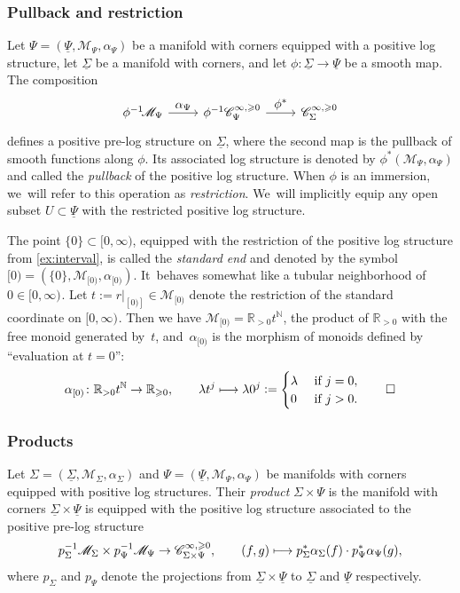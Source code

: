 \documentclass[JEP,XML,SOM,Unicode,NoFloatCountersInSection,published]{cedram}
\let\tst\textstyle
\newcommand\mto{\mathchoice{\longmapsto}{\mapsto}{\mapsto}{\mapsto}}
\theoremstyle{definition}
\theoremstyle{remark}
\newenvironment{example}
  {\pushQED{\qed}\renewcommand{\qedsymbol}{$\lozenge$}\examplex}
  {\popQED\endexamplex}
\let\defn\emph
\newcommand{\RR}{\mathbb{R}}
\newcommand{\NN}{\mathbb{N}}
\newcommand{\halfspc}[1]{[0,\infty)^{#1}}
\renewcommand{\ge}{\geqslant}
\newcommand{\defas}{\mathrel{\mathop:}=}
\newcommand{\cM}{\mathscr{M}}
\newcommand{\Cinfge}[1]{\mathscr{C}^{\infty, \ge 0}_{#1}}
\newcommand{\Sig}{\Sigma}
\newcommand{\uSig}{\underline{\Sigma}}
\begin{document}
\subsubsection{Pullback and restriction}

Let $\Psi=(\underline{\Psi},\cM_\Psi,\alpha_\Psi)$ be a manifold with corners equipped with a positive log structure, let $\uSig$ be a manifold with corners, and let $\phi:\uSig\to \underline{\Psi}$ be a smooth map. The composition\vspace*{-3pt}
\[
\begin{tikzcd}
\phi^{-1}\!\cM_{\Psi} \ar[r,"\tst \alpha_\Psi"] & \phi^{-1}\Cinfge{\Psi} \ar[r,"\tst \phi^*"] & \Cinfge{\Sig}
\end{tikzcd}
\]
defines a positive pre-log structure on $\uSig$, where the second map is the pullback of smooth functions along $\phi$. Its associated log structure
is denoted by $\phi^*(\cM_\Psi,\alpha_\Psi)$ and called the \defn{pullback} of the positive log structure. When $\phi$ is an immersion, we~will refer to this operation as \defn{restriction}. We~will implicitly equip any open subset $U\subset \underline{\Psi}$ with the restricted positive log structure.

\begin{example}\label{ex:endpoint}
The point $\{0\}\subset [0,\infty)$, equipped with the restriction of the positive log structure from \autoref{ex:interval}, is called the \defn{standard end} and denoted by the symbol $[0) = (\{0\},\cM_{[0)},\alpha_{[0)})$. It~behaves somewhat like a tubular neighborhood of $0\in\halfspc{}$. Let $t:= r|_{[0)]} \in \cM_{[0)}$ denote the restriction of the standard coordinate on $\halfspc{}$. Then we have $\cM_{[0)}=\RR_{>0} t^\NN$, the product of $\RR_{>0}$ with the free monoid generated by~$t$, and~$\alpha_{[0)}$ is the morphism of monoids defined by ``evaluation at $t=0$'':\vspace*{-3pt}
\[
\alpha_{[0)}\colon \RR_{>0} t^\NN \to \RR_{\ge 0}, \qquad \lambda t^j\mto \lambda 0^j \defas \begin{cases} \lambda & \mbox{ if } j=0,\\ 0 & \mbox{ if } j>0. \end{cases}\qedhere
\]
\end{example}

\subsubsection{Products}

Let $\Sig=(\uSig,\cM_\Sig,\alpha_\Sig)$ and $\Psi=(\underline{\Psi},\cM_\Psi,\alpha_\Psi)$ be manifolds with corners equipped with positive log structures. Their \defn{product} $\Sig\times\Psi$ is the manifold with corners $\uSig\times\underline{\Psi}$ is equipped with the positive log structure associated to the positive pre-log structure\vspace*{-3pt}
\[
p_\Sig^{-1}\cM_\Sig \times p_\Psi^{-1}\cM_{\Psi} \to \Cinfge{\Sig\times\Psi},\qquad (f,g) \mto p_\Sig^*\alpha_\Sig(f)\cdot
p_\Psi^*\alpha_\Psi(g),
\]
where $p_\Sig$ and $p_\Psi$ denote the projections from $\uSig\times\underline{\Psi}$ to $\uSig$ and $\underline{\Psi}$ respectively.
\end{document}
